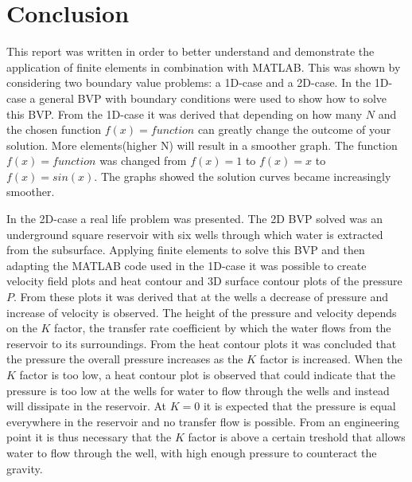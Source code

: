 \documentclass[a4paper]{report}
\begin{document}
\newpage
\chapter{Conclusion}

This report was written in order to better understand and demonstrate the application of finite elements in combination with MATLAB. This was shown by considering two boundary value problems: a 1D-case and a 2D-case. In the 1D-case a general BVP with boundary conditions were used to show how to solve this BVP. From the 1D-case it was derived that depending on how many $N$ and the chosen function $f(x)= function$ can greatly change the outcome of your solution. More elements(higher N) will result in a smoother graph. The function $f(x)= function$ was changed from $f(x)=1$ to $f(x)=x$ to $f(x)=sin(x)$. The graphs showed the solution curves became increasingly smoother.\par
In the 2D-case a real life problem was presented. The 2D BVP solved was an underground square reservoir with six wells through which water is extracted from the subsurface. Applying finite elements to solve this BVP and then adapting the MATLAB code used in the 1D-case it was possible to create velocity field plots and heat contour and 3D surface contour plots of the pressure $P$. From these plots it was derived that at the wells a decrease of pressure and increase of velocity is observed. The height of the pressure and velocity depends on the $K$ factor, the transfer rate coefficient by which the water flows from the reservoir to its surroundings. From the heat contour plots it was concluded that the pressure the overall pressure increases as the $K$ factor is increased. When the $K$ factor is too low, a heat contour plot is observed that could indicate that the pressure is too low at the wells for water to flow through the wells and instead will dissipate in the reservoir. At $K=0$ it is expected that the pressure is equal everywhere in the reservoir and no transfer flow is possible. From an engineering point it is thus necessary that the $K$ factor is above a certain treshold that allows water to flow through the well, with high enough pressure to counteract the gravity.  











\appendix
\end{document}
